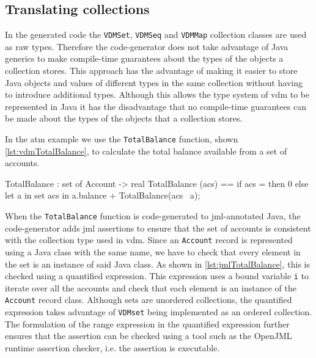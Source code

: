 \subsection{Translating collections}
\label{sec:col}

In the generated code the \texttt{VDMSet}, \texttt{VDMSeq} and
\texttt{VDMMap} collection classes are used as raw types. Therefore
the code-generator does not take advantage of Java generics to make
compile-time guarantees about the types of the objects a collection
stores. This approach has the advantage of making it easier to store
Java objects and values of different types in the same collection
without having to introduce additional types. Although this allows the
type system of \ac{vdm} to be represented in Java it has the
disadvantage that no compile-time guarantees can be made about the
types of the objects that a collection stores.

In the \ac{atm} example we use the \texttt{TotalBalance} function,
shown \autoref{lst:vdmTotalBalance}, to calculate the total balance
available from a set of accounts.

\begin{vdmsl}[style=customVdm,caption={Function that calculates the
total balance available from a set of accounts.},label={lst:vdmTotalBalance}]
TotalBalance : set of Account -> real
TotalBalance (acs) ==
 if acs = {} then
   0
 else
  let a in set acs
  in
    a.balance + TotalBalance(acs \ {a});
\end{vdmsl}

When the \texttt{TotalBalance} function is code-generated to
\ac{jml}-annotated Java, the code-generator adds \ac{jml} assertions
to ensure that the set of accounts is consistent with the collection
type used in \ac{vdm}. Since an \texttt{Account} record is represented
using a Java class with the same name, we have to check that every
element in the set is an instance of said Java class. As shown in
\autoref{lst:jmlTotalBalance}, this is checked using a quantified
expression. This expression uses a bound variable \texttt{i} to
iterate over all the accounts and check that each element is an
instance of the \texttt{Account} record class. Although sets are
unordered collections, the quantified expression takes advantage of
\texttt{VDMset} being implemented as an ordered collection. The
formulation of the range expression in the quantified expression
further ensures that the assertion can be checked using a tool such as
the OpenJML runtime assertion checker, i.e. the assertion is
executable.

